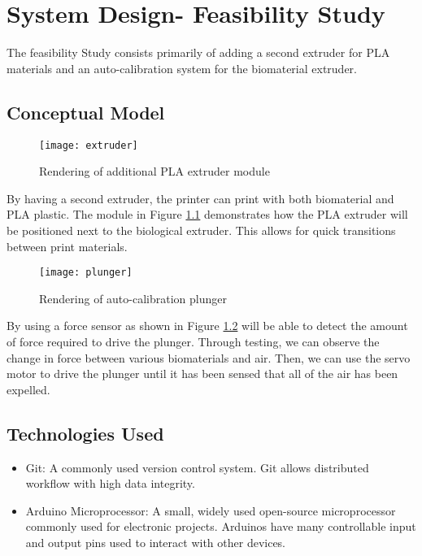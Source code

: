 \chapter{System Design- Feasibility Study}


The feasibility Study consists primarily of adding a second extruder for PLA materials and an auto-calibration system for the biomaterial extruder.

\section{Conceptual Model}

\begin{figure}[H]
\texttt{[image: extruder]}
\caption{\label{figure:extruder} Rendering of additional PLA extruder module}
\end{figure}

By having a second extruder, the printer can print with both biomaterial and PLA plastic. The module in Figure \ref{figure:extruder} demonstrates how the PLA extruder will be positioned next to the biological extruder. This allows for quick transitions between print materials. 

\begin{figure}[H]
\texttt{[image: plunger]}
\caption{\label{figure:plunger} Rendering of auto-calibration plunger}
\end{figure}

By using a force sensor as shown in Figure \ref{figure:plunger} will be able to detect the amount of force required to drive the plunger. Through testing, we can observe the change in force between various biomaterials and air. Then, we can use the servo motor to drive the plunger until it has been sensed that all of the air has been expelled. 

\section{Technologies Used}
\begin{itemize}
\item Git: A commonly used version control system. Git allows distributed workflow with high data integrity.
\item Arduino Microprocessor: A small, widely used open-source microprocessor commonly used for electronic projects. Arduinos have many controllable input and output pins used to interact with other devices.
\end{itemize}

